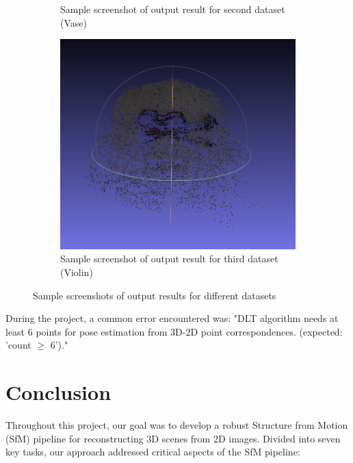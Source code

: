 \documentclass{article}
\begin{document}
\begin{figure}[h]
\begin{subfigure}[b]{0.32\textwidth}
        \caption{Sample screenshot of output result for second dataset (Vase)}
    \end{subfigure}
    \hfill
    \begin{subfigure}[b]{0.32\textwidth}
        \centering
        \includegraphics[width=\textwidth]{3.png}
        \caption{Sample screenshot of output result for third dataset (Violin)}
    \end{subfigure}
    \caption{Sample screenshots of output results for different datasets}
\end{figure}

During the project, a common error encountered was: "DLT algorithm needs at least 6 points for pose estimation from 3D-2D point correspondences. (expected: 'count $\geq$  6')."


\section{Conclusion}

Throughout this project, our goal was to develop a robust Structure from Motion (SfM) pipeline for reconstructing 3D scenes from 2D images. Divided into seven key tasks, our approach addressed critical aspects of the SfM pipeline:
\end{document}
